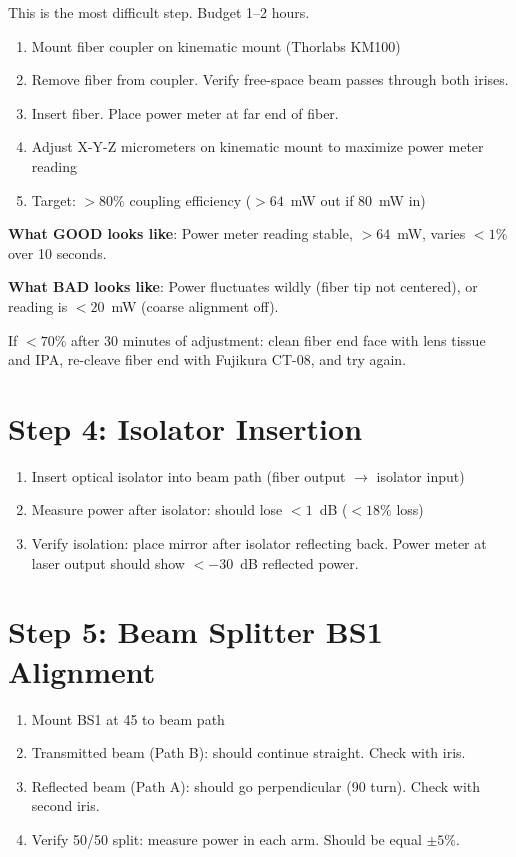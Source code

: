 \documentclass[11pt,a4paper,openany]{book}
\begin{document}
This is the most difficult step. Budget 1--2 hours.

\begin{enumerate}[nosep]
  \item Mount fiber coupler on kinematic mount (Thorlabs KM100)
  \item Remove fiber from coupler. Verify free-space beam passes through both irises.
  \item Insert fiber. Place power meter at far end of fiber.
  \item Adjust X-Y-Z micrometers on kinematic mount to maximize power meter reading
  \item Target: $> 80\%$ coupling efficiency ($> 64$~mW out if 80~mW in)
\end{enumerate}

\noindent
\textbf{What GOOD looks like}: Power meter reading stable, $> 64$~mW, varies $< 1\%$ over 10 seconds.

\noindent
\textbf{What BAD looks like}: Power fluctuates wildly (fiber tip not centered), or reading is $< 20$~mW (coarse alignment off).

\noindent
If $< 70\%$ after 30 minutes of adjustment: clean fiber end face with lens tissue and IPA, re-cleave fiber end with Fujikura CT-08, and try again.

\section{Step 4: Isolator Insertion}

\begin{enumerate}[nosep]
  \item Insert optical isolator into beam path (fiber output $\to$ isolator input)
  \item Measure power after isolator: should lose $< 1$~dB ($< 18\%$ loss)
  \item Verify isolation: place mirror after isolator reflecting back. Power meter at laser output should show $< -30$~dB reflected power.
\end{enumerate}

\section{Step 5: Beam Splitter BS1 Alignment}

\begin{enumerate}[nosep]
  \item Mount BS1 at 45\textdegree{} to beam path
  \item Transmitted beam (Path B): should continue straight. Check with iris.
  \item Reflected beam (Path A): should go perpendicular (90\textdegree{} turn). Check with second iris.
  \item Verify 50/50 split: measure power in each arm. Should be equal $\pm 5\%$.
\end{enumerate}
\end{document}

